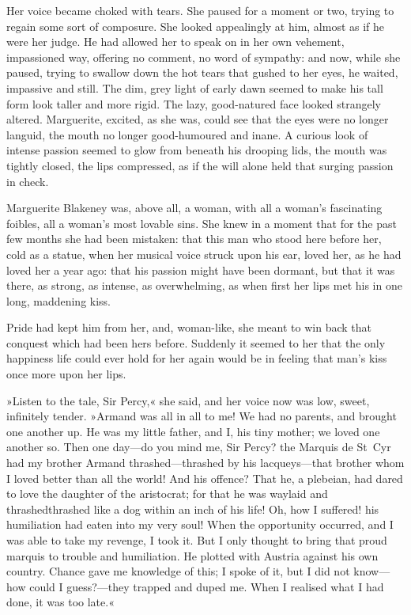 Her voice became choked with tears. She paused for a moment or two, trying to regain some sort of composure. She looked appealingly at him, almost as if he were her judge. He had allowed her to speak on in her own vehement, impassioned way, offering no comment, no word of sympathy: and now, while she paused, trying to swallow down the hot tears that gushed to her eyes, he waited, impassive and still. The dim, grey light of early dawn seemed to make his tall form look taller and more rigid. The lazy, good-natured face looked strangely altered. Marguerite, excited, as she was, could see that the eyes were no longer languid, the mouth no longer good-humoured and inane. A curious look of intense passion seemed to glow from beneath his drooping lids, the mouth was tightly closed, the lips compressed, as if the will alone held that surging passion in check.

Marguerite Blakeney was, above all, a woman, with all a woman's fascinating foibles, all a woman's most lovable sins. She knew in a moment that for the past few months she had been mistaken: that this man who stood here before her, cold as a statue, when her musical voice struck upon his ear, loved her, as he had loved her a year ago: that his passion might have been dormant, but that it was there, as strong, as intense, as overwhelming, as when first her lips met his in one long, maddening kiss.

Pride had kept him from her, and, woman-like, she meant to win back that conquest which had been hers before. Suddenly it seemed to her that the only happiness life could ever hold for her again would be in feeling that man's kiss once more upon her lips.

»Listen to the tale, Sir Percy,« she said, and her voice now was low, sweet, infinitely tender. »Armand was all in all to me! We had no parents, and brought one another up. He was my little father, and I, his tiny mother; we loved one another so. Then one day—do you mind me, Sir Percy? the Marquis de St~Cyr had my brother Armand thrashed—thrashed by his lacqueys—that brother whom I loved better than all the world! And his offence? That he, a plebeian, had dared to love the daughter of the aristocrat; for that he was waylaid and thrashed\textellipsis \allowbreak  thrashed like a dog within an inch of his life! Oh, how I suffered! his humiliation had eaten into my very soul! When the opportunity occurred, and I was able to take my revenge, I took it. But I only thought to bring that proud marquis to trouble and humiliation. He plotted with Austria against his own country. Chance gave me knowledge of this; I spoke of it, but I did not know—how could I guess?—they trapped and duped me. When I realised what I had done, it was too late.«

